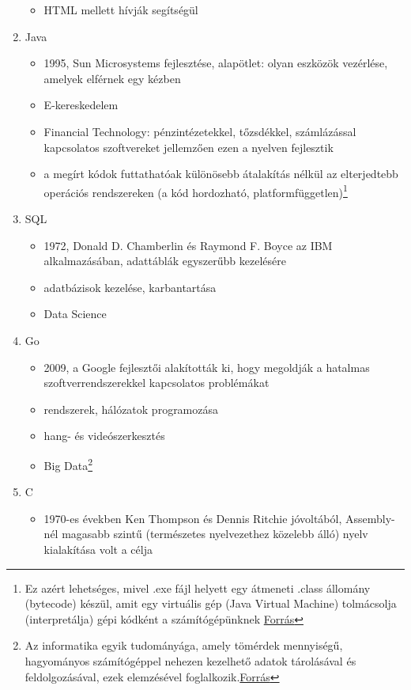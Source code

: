 \documentclass[tocnopagenum]{thesis-ekf}
\theoremstyle{definition}
\theoremstyle{remark}
\begin{document}
\begin{enumerate}
\begin{itemize}
			\item HTML mellett hívják segítségül
		\end{itemize}
		\item Java
		\begin{itemize}
			\item 1995, Sun Microsystems fejlesztése, alapötlet: olyan eszközök vezérlése, amelyek elférnek egy kézben
			\item E-kereskedelem
			\item Financial Technology: pénzintézetekkel, tőzsdékkel, számlázással kapcsolatos szoftvereket jellemzően ezen a nyelven fejlesztik
			\item a megírt kódok futtathatóak különösebb átalakítás nélkül az elterjedtebb operációs rendszereken (a kód hordozható, platformfüggetlen)\footnote{Ez azért lehetséges, mivel .exe fájl helyett egy átmeneti .class állomány (bytecode) készül, amit egy virtuális gép (Java Virtual Machine) tolmácsolja (interpretálja) gépi kódként a számítógépünknek \hyperref{https://www.upgrad.com/blog/why-is-java-platform-independent-language/}{}{}{Forrás}}
		\end{itemize}
		\item SQL
		\begin{itemize}
			\item 1972, Donald D. Chamberlin és Raymond F. Boyce az IBM alkalmazásában, adattáblák egyszerűbb kezelésére
			\item adatbázisok kezelése, karbantartása
			\item Data Science
		\end{itemize}
		\item Go
		\begin{itemize}
			\item 2009, a Google fejlesztői alakították ki, hogy megoldják a hatalmas szoftverrendszerekkel kapcsolatos problémákat
			\item rendszerek, hálózatok programozása
			\item hang- és videószerkesztés
			\item Big Data\footnote{Az informatika egyik tudományága, amely tömérdek mennyiségű, hagyományos számítógéppel nehezen kezelhető adatok tárolásával és feldolgozásával, ezek elemzésével foglalkozik.\hyperref{{https://www.youtube.com/watch?v=bAyrObl7TYE}}{}{}{Forrás}}
		\end{itemize}
		\item C
		\begin{itemize}
			\item 1970-es években Ken Thompson és Dennis Ritchie jóvoltából, Assembly-nél magasabb szintű (természetes nyelvezethez közelebb álló) nyelv kialakítása volt a célja

\end{itemize}
\end{enumerate}
\end{document}
